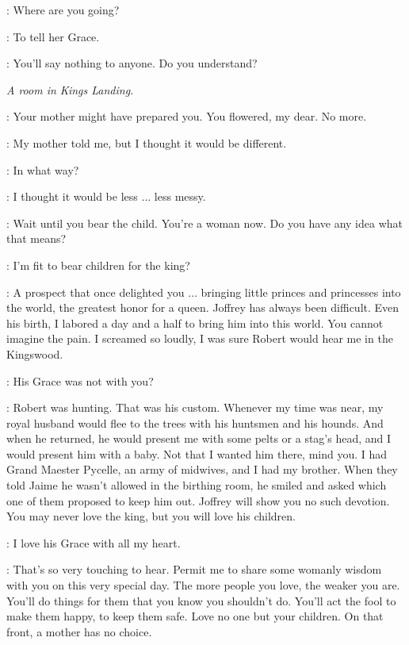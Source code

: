 \SHAE: Where are you going?

\HANDMAID: To tell her Grace.


\SHAE: You'll say nothing to anyone. Do you understand?



\scene

\textit{A room in Kings Landing.}


\CERSEI: Your mother might have prepared you. You flowered, my dear. No more.

\SANSA: My mother told me, but I thought it would be different.

\CERSEI: In what way?

\SANSA: I thought it would be less $\ldots$ less messy.

\CERSEI: Wait until you bear the child. You're a woman now. Do you have any idea what that means?

\SANSA: I'm fit to bear children for the king?

\CERSEI: A prospect that once delighted you $\ldots$ bringing little princes and princesses into the world, the greatest honor for a queen. Joffrey has always been difficult. Even his birth, I labored a day and a half to bring him into this world. You cannot imagine the pain. I screamed so loudly, I was sure Robert would hear me in the Kingswood.

\SANSA: His Grace was not with you?

\CERSEI: Robert was hunting. That was his custom. Whenever my time was near, my royal husband would flee to the trees with his huntsmen and his hounds. And when he returned, he would present me with some pelts or a stag's head, and I would present him with a baby. Not that I wanted him there, mind you. I had Grand Maester Pycelle, an army of midwives, and I had my brother. When they told Jaime he wasn't allowed in the birthing room, he smiled and asked which one of them proposed to keep him out. Joffrey will show you no such devotion. You may never love the king, but you will love his children.

\SANSA: I love his Grace with all my heart.

\CERSEI: That's so very touching to hear. Permit me to share some womanly wisdom with you on this very special day. The more people you love, the weaker you are. You'll do things for them that you know you shouldn't do. You'll act the fool to make them happy, to keep them safe. Love no one but your children. On that front, a mother has no choice.

